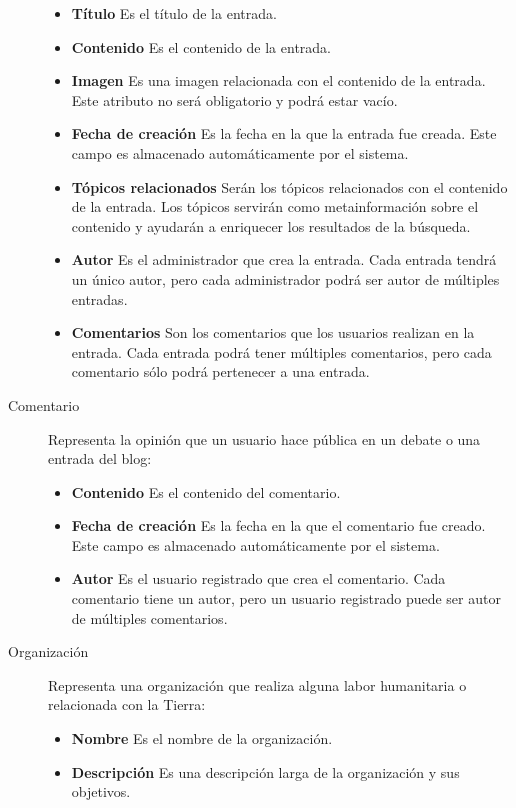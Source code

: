 \begin{description}
							\begin{itemize}
							\item \textbf{Título}  Es el título de la entrada.
							\item \textbf{Contenido}  Es el contenido de la entrada.
							\item \textbf{Imagen}  Es una imagen relacionada con el contenido de la entrada.  Este atributo no será obligatorio y podrá estar vacío.
							\item \textbf{Fecha de creación}  Es la fecha en la que la entrada fue creada.  Este campo es almacenado automáticamente por el sistema.
							\item \textbf{Tópicos relacionados}  Serán los tópicos relacionados con el contenido de la entrada.  Los tópicos servirán como metainformación sobre el contenido y ayudarán a enriquecer los resultados de la búsqueda.
							\item \textbf{Autor}  Es el administrador que crea la entrada.  Cada entrada tendrá un único autor, pero cada administrador podrá ser autor de múltiples entradas.
							\item \textbf{Comentarios}  Son los comentarios que los usuarios realizan en la entrada.  Cada entrada podrá tener múltiples comentarios, pero cada comentario sólo podrá pertenecer a una entrada.
							\end{itemize}
\item[Comentario]  Representa la opinión que un usuario hace pública en un debate o una entrada del blog:
							\begin{itemize}
							\item \textbf{Contenido}  Es el contenido del comentario.
							\item \textbf{Fecha de creación}  Es la fecha en la que el comentario fue creado.  Este campo es almacenado automáticamente por el sistema.
							\item \textbf{Autor}  Es el usuario registrado que crea el comentario.  Cada comentario tiene un autor, pero un usuario registrado puede ser autor de múltiples comentarios.
							\end{itemize}
\item[Organización]  Representa una organización que realiza alguna labor humanitaria o relacionada con la Tierra:
							\begin{itemize}
							\item \textbf{Nombre}  Es el nombre de la organización.
							\item \textbf{Descripción}  Es una descripción larga de la organización y sus objetivos.

\end{itemize}
\end{description}
